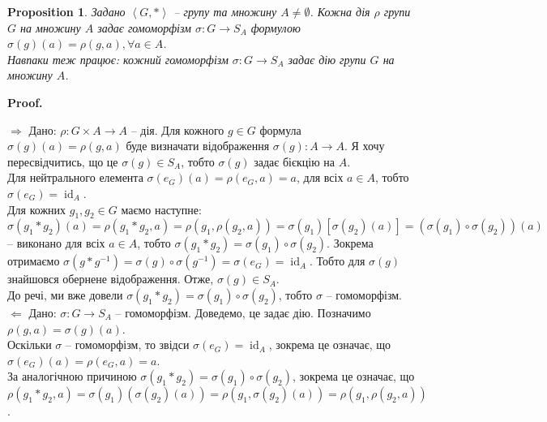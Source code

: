 \documentclass[a4paper, 10pt]{article}
\makeatletter
\def\rightproof{$\boxed{\Rightarrow}$ }
\def\leftproof{$\boxed{\Leftarrow}$ }
\theoremstyle{theoremdd}
\theoremstyle{theoremdd}
\theoremstyle{theoremdd}
\theoremstyle{theoremdd}
\theoremstyle{theoremdd}
\theoremstyle{theoremdd}
\theoremstyle{theoremdd}
\theoremstyle{theoremdd}
\theoremstyle{theoremdd}
\newtheorem{proposition}[theorem]{Proposition}
\theoremstyle{theoremdd}
\theoremstyle{theoremdd}
\theoremstyle{theoremdd}
\theoremstyle{theoremdd}
\theoremstyle{theoremdd}
\theoremstyle{theoremdd}
\renewenvironment{proof}[1][Proof.\\]{\par
\pushQED{\hfill \qed}%
\normalfont \topsep6\p@\@plus6\p@\relax
\trivlist
\item\relax
{\bfseries
#1\@addpunct{.}}\hspace\labelsep\ignorespaces
}{%
\popQED\endtrivlist\@endpefalse
}
\DeclareMathOperator{\id}{id}
\makeatother
\begin{document}
\begin{proposition}
Задано $\left< G,*\right>$ -- групу та множину $A \neq \emptyset$. Кожна дія $\rho$ групи $G$ на множину $A$ задає гомоморфізм $\sigma \colon G \to S_A$ формулою $\sigma (g)(a) = \rho(g,a), \forall a \in A$.\\
Навпаки теж працює: кожний гомоморфізм $\sigma \colon G \to S_A$ задає дію групи $G$ на множину $A$.
\end{proposition}

\begin{proof}
\rightproof Дано: $\rho \colon G \times A \to A$ -- дія. Для кожного $g \in G$ формула $\sigma(g)(a) = \rho(g,a)$ буде визначати відображення $\sigma(g) \colon A \to A$. Я хочу пересвідчитись, що це $\sigma(g) \in S_A$, тобто $\sigma(g)$ задає бієкцію на $A$.\\
Для нейтрального елемента $\sigma(e_G)(a) = \rho(e_G,a) = a$, для всіх $a \in A$, тобто $\sigma(e_G) = \id_A$.\\
Для кожних $g_1,g_2 \in G$ маємо наступне:\\
$\sigma (g_1*g_2)(a) = \rho(g_1*g_2,a) = \rho(g_1, \rho(g_2,a)) = \sigma(g_1)[\sigma(g_2)(a)] = (\sigma(g_1) \circ \sigma(g_2))(a)$ -- виконано для всіх $a \in A$, тобто $\sigma (g_1*g_2) = \sigma(g_1) \circ \sigma(g_2)$. Зокрема отримаємо $\sigma(g*g^{-1}) = \sigma(g) \circ \sigma(g^{-1}) = \sigma(e_G) = \id_A$. Тобто для $\sigma(g)$ знайшовся обернене відображення. Отже, $\sigma(g) \in S_A$.\\
До речі, ми вже довели $\sigma(g_1*g_2) = \sigma(g_1) \circ \sigma(g_2)$, тобто $\sigma$ -- гомоморфізм.
\bigskip \\
\leftproof Дано: $\sigma \colon G \to S_A$ -- гомоморфізм. Доведемо, це задає дію. Позначимо $\rho(g,a) = \sigma(g)(a)$.\\
Оскільки $\sigma$ -- гомоморфізм, то звідси $\sigma(e_G) = \id_A$, зокрема це означає, що $\sigma(e_G)(a) = \rho(e_G,a) = a$.\\
За аналогічною причиною $\sigma(g_1*g_2) = \sigma(g_1) \circ \sigma(g_2)$, зокрема це означає, що $\rho(g_1*g_2,a) = \sigma(g_1)(\sigma(g_2)(a)) = \rho(g_1, \sigma(g_2)(a)) = \rho(g_1, \rho(g_2,a))$.
\end{proof}
\end{document}
